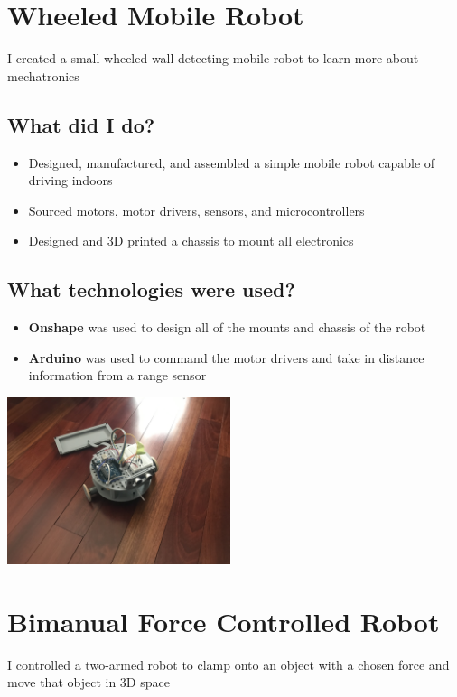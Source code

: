 \documentclass{article}
\begin{document}
    \section*{Wheeled Mobile Robot}
    I created a small wheeled wall-detecting mobile robot to learn more about mechatronics
    
\begin{multicols}{2}
    \subsection*{What did I do?}
    \begin{itemize}
        \item Designed, manufactured, and assembled a simple mobile robot capable of driving indoors 
        \item Sourced motors, motor drivers, sensors, and microcontrollers
        \item Designed and 3D printed a chassis to mount all electronics
    \end{itemize}
    \subsection*{What technologies were used?}
    \begin{itemize}
        \item \textbf{Onshape} was used to design all of the mounts and chassis of the robot
        \item \textbf{Arduino} was used to command the motor drivers and take in distance information from a range sensor   
    \end{itemize}
    \begin{center}
        \includegraphics[width=0.49\textwidth, trim={25cm 30cm 40cm 10cm},clip]{images/mobile_robot.jpg}
    \end{center}
\end{multicols}

\newpage
\section*{Bimanual Force Controlled Robot}
I controlled a two-armed robot to clamp onto an object with a chosen force and move that object in 3D space
\end{document}
